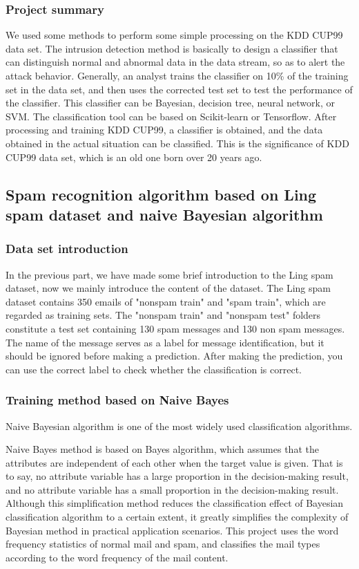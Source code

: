 \documentclass[UTF8]{article}
\begin{document}
\subsubsection{Project summary}
We used some methods to perform some simple processing on the KDD CUP99 data set. The intrusion detection method is basically to design a classifier that can distinguish normal and abnormal data in the data stream, so as to alert the attack behavior. Generally, an analyst trains the classifier on 10\% of the training set in the data set, and then uses the corrected test set to test the performance of the classifier. This classifier can be Bayesian, decision tree, neural network, or SVM. The classification tool can be based on Scikit-learn or Tensorflow. After processing and training KDD CUP99, a classifier is obtained, and the data obtained in the actual situation can be classified. This is the significance of KDD CUP99 data set, which is an old one born over 20 years ago.

\subsection{Spam recognition algorithm based on Ling spam dataset and naive Bayesian algorithm}

\subsubsection{Data set introduction}

In the previous part, we have made some brief introduction to the Ling spam dataset, now we mainly introduce the content of the dataset. The Ling spam dataset contains 350 emails of "nonspam train" and "spam train", which are regarded as training sets. The "nonspam train" and "nonspam test" folders constitute a test set containing 130 spam messages and 130 non spam messages. The name of the message serves as a label for message identification, but it should be ignored before making a prediction. After making the prediction, you can use the correct label to check whether the classification is correct.

\subsubsection{Training method based on Naive Bayes}

Naive Bayesian algorithm is one of the most widely used classification algorithms.

Naive Bayes method is based on Bayes algorithm, which assumes that the attributes are independent of each other when the target value is given. That is to say, no attribute variable has a large proportion in the decision-making result, and no attribute variable has a small proportion in the decision-making result. Although this simplification method reduces the classification effect of Bayesian classification algorithm to a certain extent, it greatly simplifies the complexity of Bayesian method in practical application scenarios. This project uses the word frequency statistics of normal mail and spam, and classifies the mail types according to the word frequency of the mail content.
\end{document}
